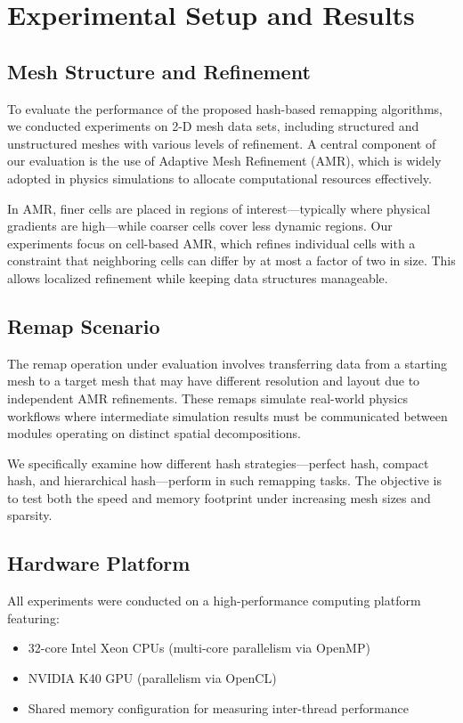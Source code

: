\section{Experimental Setup and Results}

\subsection{Mesh Structure and Refinement}

To evaluate the performance of the proposed hash-based remapping algorithms, we conducted experiments on 2-D mesh data sets, including structured and unstructured meshes with various levels of refinement. A central component of our evaluation is the use of Adaptive Mesh Refinement (AMR), which is widely adopted in physics simulations to allocate computational resources effectively.

In AMR, finer cells are placed in regions of interest—typically where physical gradients are high—while coarser cells cover less dynamic regions. Our experiments focus on cell-based AMR, which refines individual cells with a constraint that neighboring cells can differ by at most a factor of two in size. This allows localized refinement while keeping data structures manageable.

\subsection{Remap Scenario}

The remap operation under evaluation involves transferring data from a starting mesh to a target mesh that may have different resolution and layout due to independent AMR refinements. These remaps simulate real-world physics workflows where intermediate simulation results must be communicated between modules operating on distinct spatial decompositions.

We specifically examine how different hash strategies—perfect hash, compact hash, and hierarchical hash—perform in such remapping tasks. The objective is to test both the speed and memory footprint under increasing mesh sizes and sparsity.

\subsection{Hardware Platform}

All experiments were conducted on a high-performance computing platform featuring:
\begin{itemize}
  \item 32-core Intel Xeon CPUs (multi-core parallelism via OpenMP)
  \item NVIDIA K40 GPU (parallelism via OpenCL)
  \item Shared memory configuration for measuring inter-thread performance
\end{itemize}

